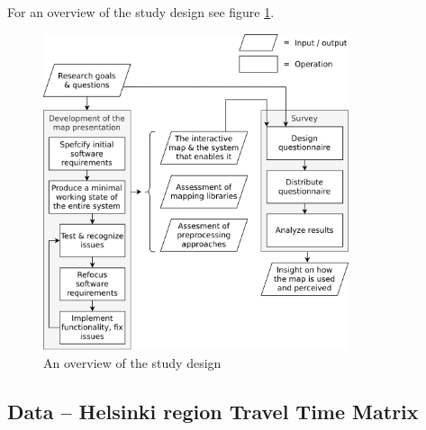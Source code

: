 For an overview of the study design see figure \ref{fig:study design}.


\begin{figure}[H]
	\centering
	\includegraphics[width=0.8\textwidth]{visual/figures/diagrams/study_design.png}
	\caption{An overview of the study design}
	\label{fig:study design}
\end{figure}


\subsection{Data -- Helsinki region Travel Time Matrix}

